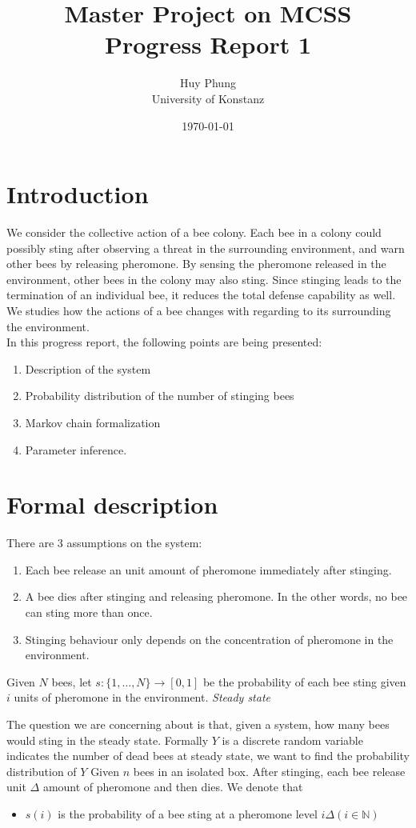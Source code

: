 \documentclass[12pt]{article}
\title{Master Project on MCSS\\ Progress Report 1}
\author{Huy Phung\\University of Konstanz}
\date{\today}
\begin{document}
\maketitle

\section{Introduction}
We consider the collective action of a bee colony. Each bee in a colony could
possibly sting after observing a threat in the surrounding environment, and warn
other bees by releasing pheromone. By sensing the pheromone released in the
environment, other bees in the colony may also sting. Since stinging leads to
the termination of an individual bee, it reduces the total defense capability as
well. We studies how the actions of a bee changes with regarding to its
surrounding the environment.\\
In this progress report, the following points are being presented:
\begin{enumerate}
\item Description of the system
\item Probability distribution of the number of stinging bees
\item Markov chain formalization
\item Parameter inference.
\end{enumerate}

\section{Formal description}
There are 3 assumptions on the system:
\begin{enumerate}
\item Each bee release an unit amount of pheromone immediately after stinging.
\item A bee dies after stinging and releasing pheromone. In the other words, no
  bee can sting more than once.
\item Stinging behaviour only depends on the concentration of pheromone in the
  environment.
\end{enumerate}
Given $N$ bees, let $s:\{1,\ldots,N\}\rightarrow[0,1]$ be the probability of
each bee sting given $i$ units of pheromone in the environment. \textit{Steady
  state}

The question we are concerning about is that, given a system, how many bees
would sting in the steady state. Formally $Y$ is a discrete random variable
indicates the number of dead bees at steady state, we want to find the
probability distribution of $Y$
Given $n$ bees in an isolated box. After stinging, each bee release unit
$\Delta$ amount of pheromone and then dies. We denote that
\begin{itemize}
\item $s(i)$ is the probability of a bee sting at a pheromone level $i\Delta
  (i\in \mathbb{N})$
\end{itemize}
\end{document}
